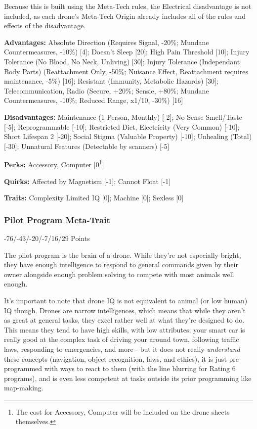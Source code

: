 Because this is built using the \GURPS Meta-Tech rules, the Electrical disadvantage is not included, as each drone's Meta-Tech Origin already includes all of the rules and effects of the disadvantage.

\textbf{Advantages:} 
Absolute Direction (Requires Signal, -20\%; Mundane Countermeasures, -10\%) [4]; Doesn't Sleep [20]; High Pain Threshold [10]; Injury Tolerance (No Blood, No Neck, Unliving) [30]; Injury Tolerance (Independant Body Parts) (Reattachment Only, -50\%; Nuisance Effect, Reattachment requires maintenance, -5\%) [16]; Resistant (Immunity, Metabolic Hazards) [30]; Telecommunication, Radio (Secure, +20\%; Sensie, +80\%; Mundane Countermeasures, -10\%; Reduced Range, x1/10, -30\%) [16]

\textbf{Disadvantages:} 
Maintenance (1 Person, Monthly) [-2]; No Sense Smell/Taste [-5]; Reprogrammable [-10]; Restricted Diet, Electricity (Very Common) [-10]; Short Lifespan 2 [-20]; Social Stigma (Valuable Property) [-10]; Unhealing (Total) [-30]; Unnatural Features (Detectable by scanners) [-5]

\textbf{Perks:}
Accessory, Computer [0\footnote{The cost for Accessory, Computer will be included on the drone sheets themselves.}]

\textbf{Quirks:}
Affected by Magnetism [-1]; Cannot Float [-1]

\textbf{Traits:}
Complexity Limited IQ [0]; Machine [0]; Sexless [0]

\subsubsection{Pilot Program Meta-Trait}
\begin{flushright}
	-76/-43/-20/-7/16/29 Points
\end{flushright}

The pilot program is the brain of a drone. While they're not especially bright, they have enough intelligence to respond to general commands given by their owner alongside enough problem solving to compete with most animals well enough. 

It's important to note that drone IQ is not equivalent to animal (or low human) IQ though. Drones are narrow intelligences, which means that while they aren't as great at general tasks, they excel rather well at what they're designed to do. This means they tend to have high skills, with low attributes; your smart car is really good at the complex task of driving your around town, following traffic laws, responding to emergencies, and more - but it does not really \textit{understand} these concepts (navigation, object recognition, laws, and ethics), it is just pre-programmed with ways to react to them (with the line blurring for Rating 6 programs), and is even less competent at tasks outside its prior programming like map-making.

